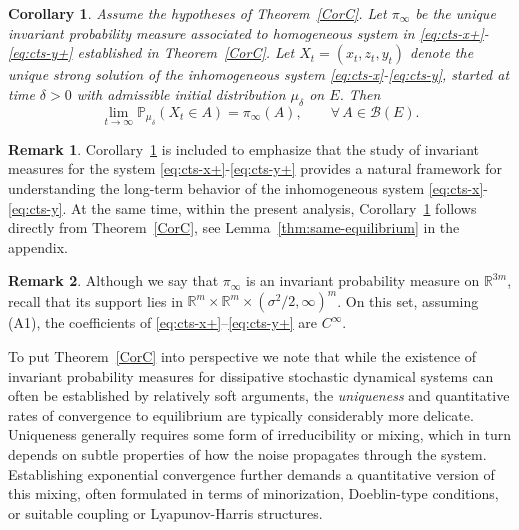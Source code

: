\documentclass[11pt, a4paper,leqno]{amsart}
\newtheorem{corollary}{Corollary}[section]
\theoremstyle{definition}
\newtheorem{remark}{Remark}[section]
\numberwithin{equation}{section}
\newcommand{\R}{\mathbb R}
\begin{document}
\begin{corollary}\label{correa}
Assume the hypotheses of Theorem~\ref{CorC}. Let $\pi_\infty$ be the unique invariant probability measure associated to homogeneous system in \eqref{eq:cts-x+}-\eqref{eq:cts-y+} established in Theorem~\ref{CorC}. Let $X_t=(x_t,z_t,y_t)$ denote the unique strong solution of the inhomogeneous system \eqref{eq:cts-x}-\eqref{eq:cts-y}, started at time $\delta>0$ with admissible initial distribution $\mu_\delta$ on $E$. Then
\begin{equation}\label{converga}
\lim_{t\to\infty}\mathbb{P}_{\mu_\delta}(X_t\in A)
=
\pi_\infty(A),
\qquad \forall\, A\in\mathcal{B}(E).
\end{equation}
\end{corollary}



\begin{remark}
Corollary~\ref{correa} is included to emphasize that the study of invariant measures for the system \eqref{eq:cts-x+}-\eqref{eq:cts-y+} provides a natural framework for understanding the long-term behavior of the inhomogeneous system \eqref{eq:cts-x}-\eqref{eq:cts-y}. At the same time, within the present analysis, Corollary~\ref{correa} follows directly from Theorem~\ref{CorC}, see Lemma~\ref{thm:same-equilibrium} in the appendix.
\end{remark}
\begin{remark}
Although we say that $\pi_\infty$ is an invariant probability measure on $\R^{3m}$, recall that its support lies in
$\R^m\times\R^m\times (\sigma^2/2,\infty)^m$. On this set, assuming \textnormal{(A1)},
the coefficients of \eqref{eq:cts-x+}–\eqref{eq:cts-y+} are $C^\infty$.
\end{remark}



To put Theorem~\ref{CorC} into perspective we note that while the existence of invariant probability measures for dissipative stochastic
dynamical systems can often be established by relatively soft arguments,
the \emph{uniqueness}  and quantitative rates of convergence
to equilibrium are typically considerably more delicate.
Uniqueness generally requires some form of irreducibility or mixing,
which in turn depends on subtle properties of how the noise propagates
through the system.
Establishing exponential convergence further demands a quantitative version
of this mixing, often formulated in terms of minorization,
Doeblin-type conditions, or suitable coupling or Lyapunov-Harris structures.
\end{document}
